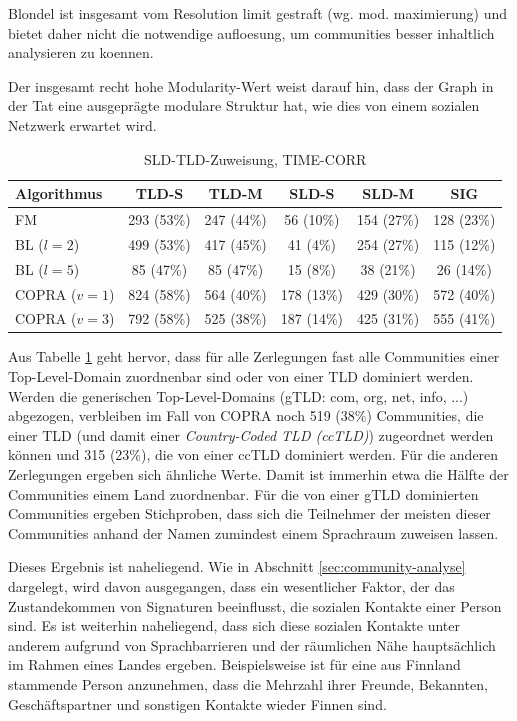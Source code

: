 Blondel ist insgesamt vom Resolution limit gestraft
(wg. mod. maximierung) und bietet daher nicht die notwendige
aufloesung, um communities besser inhaltlich analysieren zu koennen.

Der insgesamt recht hohe Modularity-Wert weist darauf hin, dass der
Graph in der Tat eine ausgepr\"agte modulare Struktur hat, wie dies
von einem sozialen Netzwerk erwartet wird.

\begin{table}[t]
  \centering
  \footnotesize
  \begin{tabular}{l|c|c|c|c|c}
    Algorithmus & TLD-S & TLD-M & SLD-S & SLD-M & SIG \\
    \hline
    FM & 293 (53\%) & 247 (44\%) & 56 (10\%) & 154 (27\%) & 128
    (23\%) \\
    \hline
    BL ($l=2$) & 499 (53\%) & 417 (45\%) & 41 (4\%) & 254 (27\%) & 115 (12\%) \\
    BL ($l=5$) & 85 (47\%) & 85 (47\%) & 15 (8\%) & 38 (21\%) & 26 (14\%) \\
    \hline
    COPRA ($v=1$) & 824 (58\%) & 564 (40\%) & 178 (13\%) & 429 (30\%)
    & 572 (40\%) \\
    COPRA ($v=3$) & 792 (58\%) & 525 (38\%) & 187 (14\%) & 425 (31\%) & 555
    (41\%)
  \end{tabular}
  \caption{SLD-TLD-Zuweisung, TIME-CORR}
  \label{tab:assign}
\end{table}

Aus Tabelle \ref{tab:assign} geht hervor, dass f\"ur alle Zerlegungen
fast alle Communities einer Top-Level-Domain zuordnenbar sind oder von
einer TLD dominiert werden. Werden die generischen Top-Level-Domains
(gTLD: com, org, net, info, ...) abgezogen, verbleiben im Fall von COPRA
noch 519 (38\%) Communities, die einer TLD (und damit einer
\emph{Country-Coded TLD (ccTLD)}) zugeordnet werden k\"onnen und 315
(23\%), die von einer ccTLD dominiert werden. F\"ur die anderen
Zerlegungen ergeben sich \"ahnliche Werte. Damit ist immerhin etwa die
H\"alfte der Communities einem Land zuordnenbar. F\"ur die von einer
gTLD dominierten Communities ergeben Stichproben, dass sich die
Teilnehmer der meisten dieser Communities anhand der Namen zumindest
einem Sprachraum zuweisen lassen.

Dieses Ergebnis ist naheliegend. Wie in Abschnitt
\ref{sec:community-analyse} dargelegt, wird davon ausgegangen, dass
ein wesentlicher Faktor, der das Zustandekommen von Signaturen
beeinflusst, die sozialen Kontakte einer Person sind. Es ist weiterhin
naheliegend, dass sich diese sozialen Kontakte unter anderem aufgrund
von Sprachbarrieren und der r\"aumlichen N\"ahe haupts\"achlich im
Rahmen eines Landes ergeben. Beispielsweise ist f\"ur eine aus
Finnland stammende Person anzunehmen, dass die Mehrzahl ihrer Freunde,
Bekannten, Gesch\"aftspartner und sonstigen Kontakte wieder Finnen
sind.

